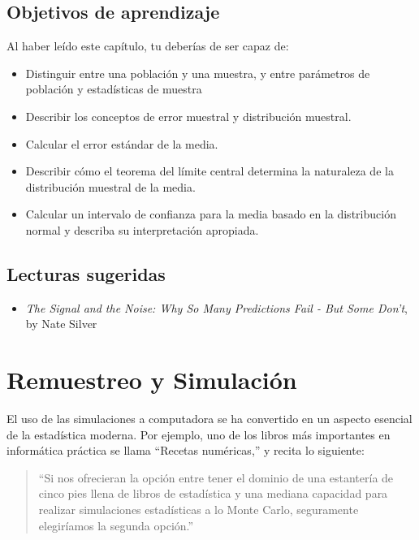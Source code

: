 \documentclass[
  12pt,
]{book}
\providecommand{\tightlist}{%
  \setlength{\itemsep}{0pt}\setlength{\parskip}{0pt}}
\begin{document}
\hypertarget{objetivos-de-aprendizaje}{%
\section{Objetivos de aprendizaje}\label{objetivos-de-aprendizaje}}

Al haber leído este capítulo, tu deberías de ser capaz de:

\begin{itemize}
\tightlist
\item
  Distinguir entre una población y una muestra, y entre parámetros de población y estadísticas de muestra
\item
  Describir los conceptos de error muestral y distribución muestral.
\item
  Calcular el error estándar de la media.
\item
  Describir cómo el teorema del límite central determina la naturaleza de la distribución muestral de la media.
\item
  Calcular un intervalo de confianza para la media basado en la distribución normal y describa su interpretación apropiada.
\end{itemize}

\hypertarget{lecturas-sugeridas}{%
\section{Lecturas sugeridas}\label{lecturas-sugeridas}}

\begin{itemize}
\tightlist
\item
  \emph{The Signal and the Noise: Why So Many Predictions Fail - But Some Don't}, by Nate Silver
\end{itemize}

\hypertarget{resampling-and-simulation}{%
\chapter{Remuestreo y Simulación}\label{resampling-and-simulation}}

El uso de las simulaciones a computadora se ha convertido en un aspecto esencial de la estadística moderna. Por ejemplo, uno de los libros más importantes en informática práctica se llama ``Recetas numéricas,'' y recita lo siguiente:

\begin{quote}
``Si nos ofrecieran la opción entre tener el dominio de una estantería de cinco pies llena de libros de estadística y una mediana capacidad para realizar simulaciones estadísticas a lo Monte Carlo, seguramente elegiríamos la segunda opción.''
\end{quote}
\end{document}
